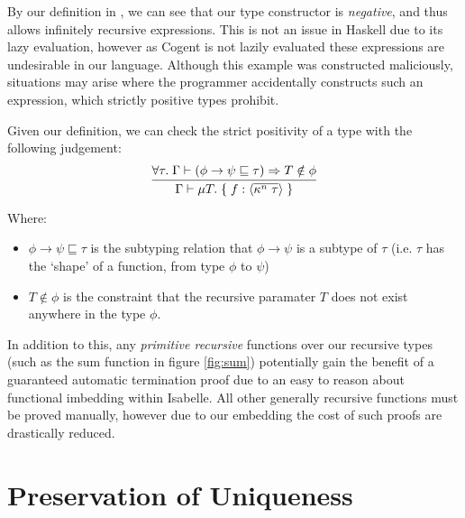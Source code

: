 By our definition in , we can see that our type constructor is \textit{negative}, and
thus allows infinitely recursive expressions. This is not an issue in Haskell due to its lazy evaluation,
however as Cogent is not lazily evaluated these expressions are undesirable in our language. 
Although this example was constructed maliciously, situations may arise where the
programmer accidentally constructs such an expression, which strictly positive types prohibit.

Given our definition, we can check the strict positivity of a type with the following judgement:
$$
\infer{
    \Gamma \vdash \mu T.\; \{\; f: \langle \overline{\kappa^n\; \tau} \rangle\; \}
}{
   \forall \tau.\; \Gamma \vdash (\phi \rightarrow \psi \sqsubseteq \tau) \implies T \notin \phi
}
$$

Where:
\begin{itemize}
    \item 
        $\phi \rightarrow \psi \sqsubseteq \tau$ is the subtyping relation that $\phi \rightarrow \psi$
        is a subtype of $\tau$ (i.e. $\tau$ has the `shape' of a function, from type $\phi$ to $\psi$) 
    \item
        $T \notin \phi$ is the constraint that the recursive paramater $T$ does not exist anywhere in the type $\phi$.
\end{itemize}

In addition to this, any \textit{primitive recursive} functions over our recursive types 
(such as the sum function in figure \ref{fig:sum}) potentially gain the benefit of a guaranteed
automatic termination proof due to an easy to reason about functional imbedding within Isabelle.
All other generally recursive functions must be proved manually, however due to our embedding
the cost of such proofs are drastically reduced.

\section{Preservation of Uniqueness}

